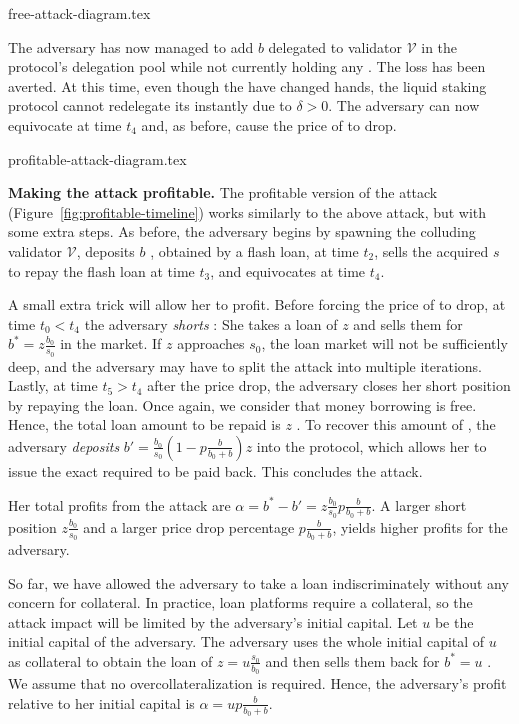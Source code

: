 {free-attack-diagram.tex}

The adversary has now managed to add $b$ \asset delegated to validator $\mathcal{V}$
in the protocol's delegation pool while not currently holding
any \stasset. The loss has been averted.
At this time, even though the
\stassets have changed hands, the liquid staking protocol cannot redelegate
its \assets instantly due to $\delta > 0$.
The adversary can now equivocate at time $t_4$ and, as before, cause the
price of \stasset to drop.


{profitable-attack-diagram.tex}

\noindent
\textbf{Making the attack profitable.}
The profitable version of the attack (Figure~\ref{fig:profitable-timeline}) works similarly to the above
attack, but with some extra steps. As before, the adversary begins by spawning the
colluding validator $\mathcal{V}$, deposits $b$ \asset, obtained by a flash loan, at time $t_2$,
sells the acquired $s$ \stasset to repay the flash loan at time $t_3$, and equivocates at time $t_4$.

A small extra trick will allow her to profit.
Before forcing the price of \stasset to drop, at time $t_0 < t_4$
the adversary \emph{shorts}
\stasset: She takes a loan of $z$ \stassets and
sells them for $b^* = z \frac{b_0}{s_0}$ \asset in the market.
If $z$ approaches $s_0$, the loan market will not be sufficiently deep,
and the adversary may have to split the attack into multiple iterations.
Lastly, at time $t_5 > t_4$ after the price drop, the adversary closes her short position by repaying the
\stasset loan. Once again, we consider that money borrowing is free. Hence,
the total loan amount to be repaid is $z$ \stasset.
To recover this amount of \stasset, the adversary \emph{deposits}
$b' = \frac{b_0}{s_0}(1 - p\frac{b}{b_0 + b}) z$ \asset
into the protocol, which allows her to issue the exact required \stasset
to be paid back. This concludes the attack.

Her total profits from the attack are
$\alpha = b^* - b' = z \frac{b_0}{s_0} p \frac{b}{b_0 + b}$.
A larger short position $z \frac{b_0}{s_0}$ and a larger
\stasset price drop percentage $p \frac{b}{b_0 + b}$, yields higher profits for the adversary.

So far, we have allowed the adversary to take a loan indiscriminately without
any concern for collateral. In practice, loan platforms
require a collateral, so the attack impact will be limited by the adversary's
initial capital. Let $u$ \asset be the initial capital of the adversary.
The adversary uses the whole initial capital of $u$ \asset as
collateral to obtain the loan of $z = u \frac{s_0}{b_0}$ \stasset and
then sells them back for $b^* = u$ \asset.
We assume that no overcollateralization is required.
Hence, the adversary's profit relative to her initial capital is
$\alpha = u p \frac{b}{b_0 + b}$.



